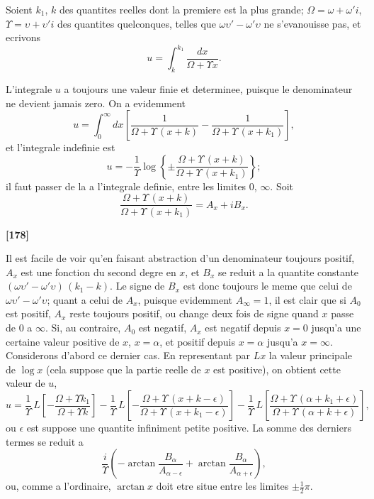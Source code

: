 \documentclass[11pt,a4paper]{article}
\begin{document}
Soient $k_1$, $k$ des quantites reelles dont la premiere est la plus grande; $\Omega = \omega + \omega'i$,
$\Upsilon = \upsilon + \upsilon'i$ des quantites quelconques, telles que $\omega\upsilon' - \omega'\upsilon$ ne s'evanouisse pas, et ecrivons
\begin{equation}
u = \int_k^{k_1} \frac{dx}{\Omega + \Upsilon x}. \tag{55}
\end{equation}

L'integrale $u$ a toujours une valeur finie et determinee, puisque le denominateur ne
devient jamais zero. On a evidemment
\begin{equation}
u = \int_0^{\infty} dx \left[\frac{1}{\Omega + \Upsilon\, (x+k)} - \frac{1}{\Omega + \Upsilon\, (x+k_1)}\right], \tag{56}
\end{equation}
et l'integrale indefinie est
\begin{equation}
u = -\frac{1}{\Upsilon}\log \left\{\pm \frac{\Omega + \Upsilon\, (x+k)}{\Omega + \Upsilon\, (x+k_1)}\right\}; \tag{57}
\end{equation}
il faut passer de la a l'integrale definie, entre les limites $0$, $\infty$. Soit
\begin{equation}
\frac{\Omega + \Upsilon\, (x+k)}{\Omega + \Upsilon\, (x+k_1)} = A_x + iB_x. \tag{58}
\end{equation}

\textbf{[178]}

Il est facile de voir qu'en faisant abstraction d'un denominateur toujours positif, $A_x$
est une fonction du second degre en $x$, et $B_x$ se reduit a la quantite constante
$(\omega\upsilon' - \omega'\upsilon)\, (k_1 - k)$. Le signe de $B_x$ est donc toujours le meme que celui de $\omega\upsilon' - \omega'\upsilon$;
quant a celui de $A_x$, puisque evidemment $A_{\infty} = 1$, il est clair que si $A_0$ est positif,
$A_x$ reste toujours positif, ou change deux fois de signe quand $x$ passe de $0$ a $\infty$. Si,
au contraire, $A_0$ est negatif, $A_x$ est negatif depuis $x = 0$ jusqu'a une certaine valeur
positive de $x$, $x = \alpha$, et positif depuis $x = \alpha$ jusqu'a $x = \infty$. Considerons d'abord ce dernier
cas. En representant par $Lx$ la valeur principale de $\log x$ (cela suppose que la partie
reelle de $x$ est positive), on obtient cette valeur de $u$,
\[u = \frac{1}{\Upsilon}\, L\left[-\frac{\Omega + \Upsilon k_1}{\Omega + \Upsilon k}\right]
- \frac{1}{\Upsilon}\, L\left[-\frac{\Omega + \Upsilon\, (x+k - \epsilon)}{\Omega + \Upsilon\, (x+k_1 - \epsilon)}\right]
- \frac{1}{\Upsilon}\, L\left[\frac{\Omega + \Upsilon\, (\alpha+k_1 + \epsilon)}{\Omega + \Upsilon\, (\alpha+k + \epsilon)}\right],\]
ou $\epsilon$ est suppose une quantite infiniment petite positive. La somme des derniers termes
se reduit a
\begin{equation}
\frac{i}{\Upsilon}\left(-\arctan \frac{B_{\alpha}}{A_{\alpha-\epsilon}} + \arctan \frac{B_{\alpha}}{A_{\alpha+\epsilon}}\right), \tag{59}
\end{equation}
ou, comme a l'ordinaire, $\arctan x$ doit etre situe entre les limites $\pm \frac{1}{2}\pi$.
\end{document}
